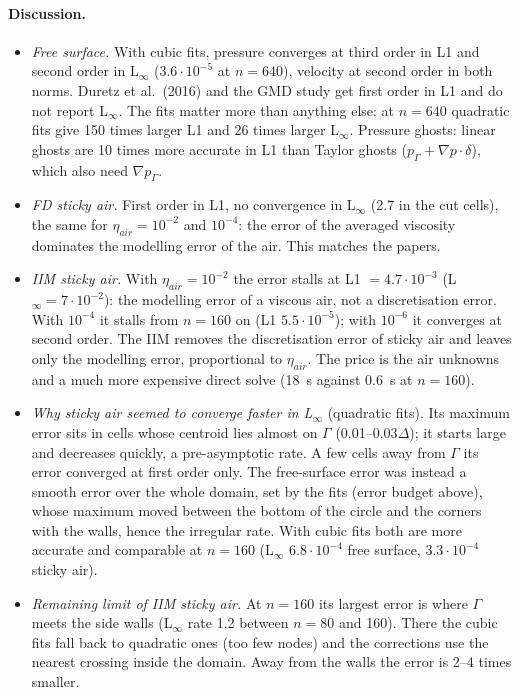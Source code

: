 \documentclass[11pt,a4paper]{article}
\begin{document}
\paragraph{Discussion.}
\begin{itemize}
  \item \emph{Free surface.} With cubic fits, pressure converges at third order in L1 and second
    order in L$_\infty$ ($3.6\cdot10^{-5}$ at $n=640$), velocity at second order in both norms.
    Duretz et al.\ (2016) and the GMD study get first order in L1 and do not report L$_\infty$.
    The fits matter more than anything else: at $n=640$ quadratic fits give 150 times larger L1
    and 26 times larger L$_\infty$. Pressure ghosts: linear ghosts are 10 times more accurate in
    L1 than Taylor ghosts ($p_\Gamma+\nabla p\cdot\delta$), which also need $\nabla p_\Gamma$.
  \item \emph{FD sticky air.} First order in L1, no convergence in L$_\infty$ (2.7 in the cut
    cells), the same for $\eta_{air}=10^{-2}$ and $10^{-4}$: the error of the averaged viscosity
    dominates the modelling error of the air. This matches the papers.
  \item \emph{IIM sticky air.} With $\eta_{air}=10^{-2}$ the error stalls at L1 $=4.7\cdot10^{-3}$
    (L$_\infty=7\cdot10^{-2}$): the modelling error of a viscous air, not a discretisation error.
    With $10^{-4}$ it stalls from $n=160$ on (L1 $5.5\cdot10^{-5}$); with $10^{-6}$ it converges
    at second order. The IIM removes the discretisation error of sticky air and leaves only the
    modelling error, proportional to $\eta_{air}$. The price is the air unknowns and a much more
    expensive direct solve (18~s against 0.6~s at $n=160$).
  \item \emph{Why sticky air seemed to converge faster in L$_\infty$} (quadratic fits). Its
    maximum error sits in cells whose centroid lies almost on $\Gamma$ (0.01--0.03$\Delta$); it
    starts large and decreases quickly, a pre-asymptotic rate. A few cells away from $\Gamma$ its
    error converged at first order only. The free-surface error was instead a smooth error over
    the whole domain, set by the fits (error budget above), whose maximum moved between the bottom
    of the circle and the corners with the walls, hence the irregular rate. With cubic fits both
    are more accurate and comparable at $n=160$ (L$_\infty$ $6.8\cdot10^{-4}$ free surface,
    $3.3\cdot10^{-4}$ sticky air).
  \item \emph{Remaining limit of IIM sticky air.} At $n=160$ its largest error is where $\Gamma$
    meets the side walls (L$_\infty$ rate 1.2 between $n=80$ and 160). There the cubic fits fall
    back to quadratic ones (too few nodes) and the corrections use the nearest crossing inside
    the domain. Away from the walls the error is 2--4 times smaller.
\end{itemize}
\end{document}
